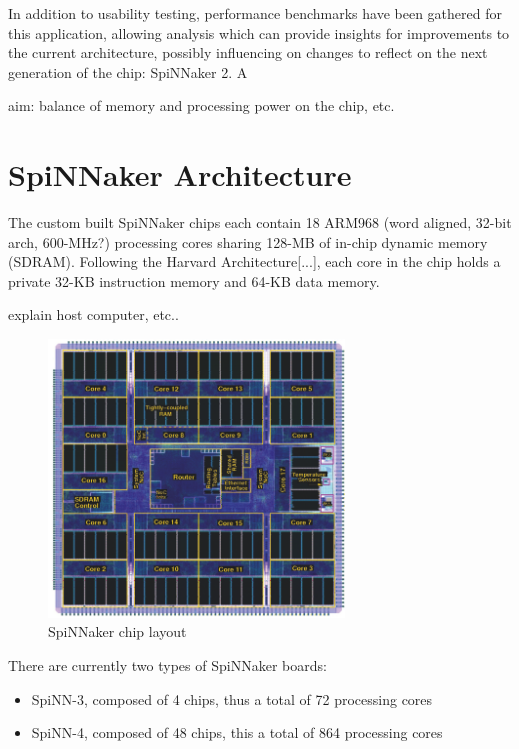 In addition to usability testing, performance benchmarks have been gathered for this application, allowing analysis which can provide insights for improvements to the current architecture, possibly influencing on changes to reflect on the next generation of the chip: SpiNNaker 2. A 

aim: balance of memory and processing power on the chip, etc.

\section{SpiNNaker Architecture}

The custom built SpiNNaker chips each contain 18 ARM968 (word aligned, 32-bit arch, 600-MHz?) processing cores sharing 128-MB of in-chip dynamic memory (SDRAM). Following the Harvard Architecture[...], each core in the chip holds a private 32-KB instruction memory and 64-KB data memory.

explain host computer, etc..

\begin{figure}
\begin{center}
	\includegraphics[width=0.7\textwidth, natwidth=608, natheight=571]{images/chip.png}
\end{center}
\caption{SpiNNaker chip layout}
\end{figure}

There are currently two types of SpiNNaker boards:
\begin{itemize}
\item SpiNN-3, composed of 4 chips, thus a total of 72 processing cores
\item SpiNN-4, composed of 48 chips, this a total of 864 processing cores
\end{itemize}

